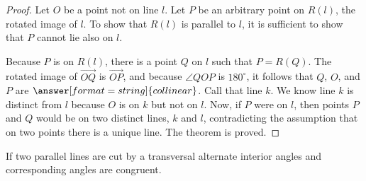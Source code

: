 \documentclass[nooutcomes]{ximera}
\begin{document}
\begin{proof}
Let $O$ be a point not on line $l$.  Let $P$ be an arbitrary point on $R(l)$, the rotated image of $l$.  
To show that $R(l)$ is parallel to $l$, 
it is sufficient to show that $P$ cannot lie also on $l$.  

\begin{image}
\end{image}

Because $P$ is on $R(l)$, there is a point $Q$ on $l$ such that $P = R(Q)$.  The rotated image of 
$\overrightarrow{OQ}$ is $\overrightarrow{OP}$, and because $\angle QOP$ is $180^\circ$, it 
follows that $Q$, $O$, and $P$ are $\answer[format=string]{collinear}$.  Call that line $k$.  We know line $k$ is distinct 
from $l$ because $O$ is on $k$ but not on $l$.  Now, if $P$ were on $l$, then points $P$ and $Q$ 
would be on two distinct lines, $k$ and $l$, contradicting the assumption that on two points there 
is a unique line.  The theorem is proved.  
\end{proof}

\begin{theorem}
If two parallel lines are cut by a transversal alternate interior angles and corresponding angles are congruent.
\end{theorem}
\end{document}
